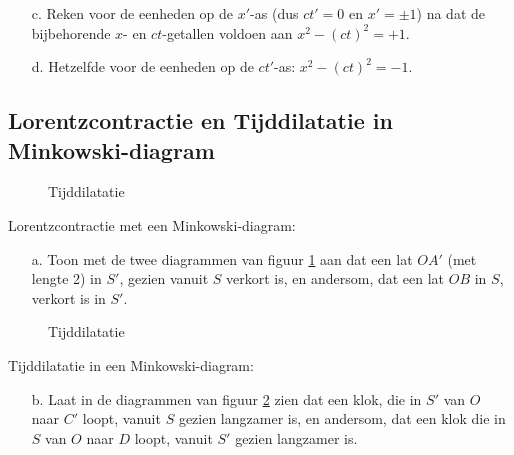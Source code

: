 \begin{itemize}
\item [c.]
  Reken  voor  de  eenheden  op de $x'$-as (dus $ct' = 0$ en
  $x' = \pm 1$) na dat de bijbehorende $x$- en 
  $ct$-getallen voldoen aan $x^{2} - (ct)^{2} = +1$.
\item [d.]
  Hetzelfde voor de eenheden op de $ct'$-as: $x^{2} - (ct)^{2} = -1$.
\end{itemize}


\subsection{Lorentzcontractie en Tijddilatatie in Minkowski-diagram}



\begin{figure}[ht]
 \begin{center}
 \mbox{\epsfxsize=10cm}
 \caption{Tijddilatatie}
 \label{f:mcontractie}
 \end{center}
 \end{figure}


 Lorentzcontractie met een Minkowski-diagram: 
\begin{itemize}
\item [a.]
 Toon  met  de  twee diagrammen van figuur \ref{f:mcontractie} aan dat een 
lat $OA'$
 (met lengte 2) in $S'$, gezien vanuit $S$ verkort 
 is, en andersom, dat een lat $OB$ in $S$, verkort is in $S'$.
\end{itemize}


 \begin{figure}[ht]
 \begin{center}
 \mbox{\epsfxsize=10cm}
 \caption{Tijddilatatie}
 \label{f:mtijddil}
 \end{center}
 \end{figure}

  Tijddilatatie in een Minkowski-diagram:
\begin{itemize}
\item [b.]
Laat in de diagrammen van figuur \ref{f:mtijddil} zien dat een klok, 
die in $S'$ van $O$ naar $C'$ loopt, vanuit $S$ gezien langzamer is, 
en andersom, dat een klok die in $S$ van $O$ naar $D$ loopt, vanuit $S'$ gezien 
langzamer is.
\end{itemize}


